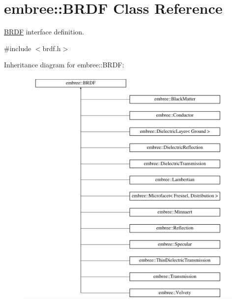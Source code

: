 \hypertarget{classembree_1_1_b_r_d_f}{
\section{embree::BRDF Class Reference}
\label{classembree_1_1_b_r_d_f}
}


\hyperlink{classembree_1_1_b_r_d_f}{BRDF} interface definition.  




{\ttfamily \#include $<$brdf.h$>$}

Inheritance diagram for embree::BRDF:\begin{figure}[H]
\begin{center}
\leavevmode
\includegraphics[height=12.000000cm]{classembree_1_1_b_r_d_f}
\end{center}
\end{figure}
